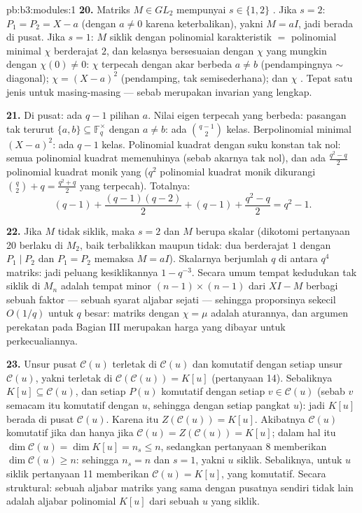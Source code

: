 \begin{solution}{pb:b3:modules:1}
\textbf{20.} Matriks $M \in GL_2$ mempunyai $s \in \{1, 2\}$ . Jika $s = 2$: $P_1 = P_2 = X - a$ (dengan $a \neq 0$ karena
keterbalikan), yakni $M = aI$, jadi berada di pusat. Jika $s = 1$: $M$
siklik dengan polinomial karakteristik $=$ polinomial minimal $\chi$
berderajat $2$, dan kelasnya bersesuaian dengan $\chi$ yang mungkin
dengan $\chi(0) \neq 0$: $\chi$ terpecah dengan akar berbeda $a \neq
b$ (pendampingnya $\sim$ diagonal); $\chi = (X - a)^2$ (pendamping,
tak semisederhana); dan $\chi$ . Tepat satu jenis untuk masing-masing ---
sebab  merupakan invarian yang lengkap.

\textbf{21.} Di pusat: ada $q - 1$ pilihan $a$. Nilai eigen terpecah
yang berbeda: pasangan tak terurut $\{a, b\} \subseteq
\mathbb F_q^\times$ dengan $a \neq b$: ada $\binom{q-1}2$ kelas.
Berpolinomial minimal $(X-a)^2$: ada $q - 1$ kelas. Polinomial kuadrat  dengan
suku konstan tak nol: semua polinomial kuadrat  memenuhinya
(sebab akarnya tak nol), dan ada $\frac{q^2 - q}2$
polinomial kuadrat monik yang  ($q^2$ polinomial kuadrat monik dikurangi
$\binom q2 + q = \frac{q^2+q}2$ yang terpecah). Totalnya:
\[
(q - 1) + \frac{(q-1)(q-2)}2 + (q - 1) + \frac{q^2 - q}2
= q^2 - 1 .
\]

\textbf{22.} Jika $M$ tidak siklik, maka $s = 2$ dan $M$ berupa skalar
(dikotomi pertanyaan 20 berlaku di $M_2$, baik terbalikkan maupun tidak: dua
 berderajat $1$ dengan $P_1 \mid P_2$ dan $P_1 =
P_2$ memaksa $M = aI$). Skalarnya berjumlah $q$ di antara $q^4$
matriks: jadi peluang kesiklikannya $1 - q^{-3}$. Secara umum
tempat kedudukan tak siklik di $M_n$ adalah tempat minor $(n-1)\times(n-1)$
dari $XI - M$ berbagi sebuah faktor --- sebuah syarat aljabar sejati
--- sehingga proporsinya sekecil $O(1/q)$ untuk $q$ besar: matriks
dengan $\chi = \mu$ adalah aturannya, dan argumen perekatan pada Bagian III
merupakan harga yang dibayar untuk perkecualiannya.

\textbf{23.} Unsur pusat $\mathcal C(u)$ terletak
di $\mathcal C(u)$ dan komutatif dengan setiap unsur
$\mathcal C(u)$, yakni terletak di $\mathcal C(\mathcal C(u)) =
K[u]$ (pertanyaan 14). Sebaliknya $K[u] \subseteq \mathcal C(u)$,
dan setiap $P(u)$ komutatif dengan setiap $v \in \mathcal C(u)$
(sebab $v$ semacam itu komutatif dengan $u$, sehingga dengan setiap pangkat $u$):
jadi $K[u]$ berada di pusat $\mathcal C(u)$. Karena itu $Z(\mathcal C(u))
= K[u]$. Akibatnya $\mathcal C(u)$ komutatif jika dan hanya jika
$\mathcal C(u) = Z(\mathcal C(u)) = K[u]$; dalam hal itu
$\dim\mathcal C(u) = \dim K[u] = n_s \leq n$, sedangkan pertanyaan 8
memberikan $\dim\mathcal C(u) \geq n$: sehingga $n_s = n$ dan $s = 1$,
yakni $u$ siklik. Sebaliknya, untuk $u$ siklik pertanyaan 11
memberikan $\mathcal C(u) = K[u]$, yang komutatif. Secara struktural: sebuah
aljabar matriks yang sama dengan pusatnya sendiri tidak lain adalah
aljabar polinomial $K[u]$ dari sebuah $u$ yang siklik.


\end{solution}
